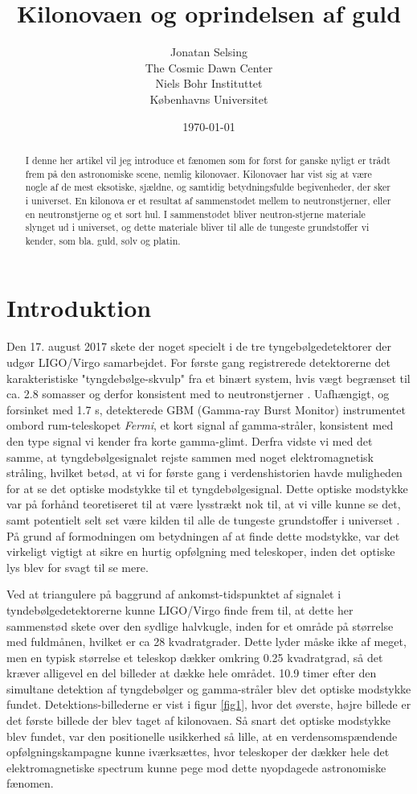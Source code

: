 \documentclass[twocolumn]{article}
\title{Kilonovaen og oprindelsen af guld}
\author{Jonatan Selsing \\
	The Cosmic Dawn Center \\
	 Niels Bohr Instituttet  \\
	 Københavns Universitet \\
	}
\date{\today}
\begin{document}
\maketitle


\begin{abstract}
I denne her artikel vil jeg introduce et fænomen som for først for ganske nyligt er trådt frem på den astronomiske scene, nemlig kilonovaer. Kilonovaer har vist sig at være nogle af de mest eksotiske, sjældne, og samtidig betydningsfulde begivenheder, der sker i universet. En kilonova er et resultat af sammenstødet mellem to neutronstjerner, eller en neutronstjerne og et sort hul. I sammenstødet bliver neutron-stjerne materiale slynget ud i universet, og dette materiale bliver til alle de tungeste grundstoffer vi kender, som bla. guld, sølv og platin. 
\end{abstract}

\section{Introduktion}
Den 17. august 2017 skete der noget specielt i de tre tyngebølgedetektorer der udgør LIGO/Virgo samarbejdet. For første gang registrerede detektorerne det karakteristiske "tyngdebølge-skvulp" fra et binært system, hvis vægt begrænset til ca. 2.8 somasser og derfor konsistent med to neutronstjerner \cite{abbotta}. Uafhængigt, og forsinket med 1.7 s, detekterede GBM (Gamma-ray Burst Monitor) instrumentet ombord rum-teleskopet \textit{Fermi}, et kort signal af gamma-stråler, konsistent med den type signal vi kender fra korte gamma-glimt. Derfra vidste vi med det samme, at tyngdebølgesignalet rejste sammen med noget elektromagnetisk stråling, hvilket betød, at vi for første gang i verdenshistorien havde muligheden for at se det optiske modstykke til et tyngdebølgesignal. Dette optiske modstykke var på forhånd teoretiseret til at være lysstrækt nok til, at vi ville kunne se det, samt potentielt selt set være kilden til alle de tungeste grundstoffer i universet \cite{lattimer}. På grund af formodningen om betydningen af at finde dette modstykke, var det virkeligt vigtigt at sikre en hurtig opfølgning med teleskoper, inden det optiske lys blev for svagt til se mere. 

Ved at triangulere på baggrund af ankomst-tidspunktet af signalet i tyndebølgedetektorerne kunne LIGO/Virgo finde frem til, at dette her sammenstød skete over den sydlige halvkugle, inden for et område på størrelse med fuldmånen, hvilket er ca 28 kvadratgrader. Dette lyder måske ikke af meget, men en typisk størrelse et teleskop dækker omkring 0.25 kvadratgrad, så det kræver alligevel en del billeder at dække hele området. 10.9 timer efter den simultane detektion af tyngdebølger og gamma-stråler blev det optiske modstykke fundet. Detektions-billederne er vist i figur \ref{fig1}, hvor det øverste, højre billede er det første billede der blev taget af kilonovaen. Så snart det optiske modstykke blev fundet, var den positionelle usikkerhed så lille, at en verdensomspændende opfølgningskampagne kunne iværksættes, hvor teleskoper der dækker hele det elektromagnetiske spectrum kunne pege mod dette nyopdagede astronomiske fænomen.
\end{document}
